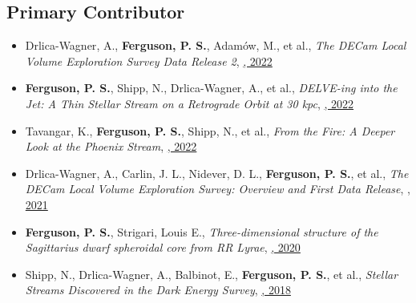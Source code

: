 \renewcommand{\labelitemi}{$$}
\subsection{Primary Contributor}
\begin{itemize}[itemsep=1pt]
    \item {Drlica-Wagner}, A., \textbf{Ferguson, P. S.}, {Adam{\'o}w}, M., et al., \textit{{The DECam Local Volume Exploration Survey Data Release 2}}, \href{https://ui.adsabs.harvard.edu/abs/2022ApJS..261...38D}{\textbf{\apjs}, 2022}
    \item \textbf{Ferguson, P. S.}, {Shipp}, N., {Drlica-Wagner}, A., et al., \textit{{DELVE-ing into the Jet: A Thin Stellar Stream on a Retrograde Orbit at 30 kpc}}, \href{https://ui.adsabs.harvard.edu/abs/2022AJ....163...18F}{\textbf{\aj}, 2022}
    \item {Tavangar}, K., \textbf{Ferguson, P. S.}, {Shipp}, N., et al., \textit{{From the Fire: A Deeper Look at the Phoenix Stream}}, \href{https://ui.adsabs.harvard.edu/abs/2022ApJ...925..118T}{\textbf{\apj}, 2022}
    \item {Drlica-Wagner}, A., {Carlin}, J. L., {Nidever}, D. L., \textbf{Ferguson, P. S.}, et al., \textit{{The DECam Local Volume Exploration Survey: Overview and First Data Release}}, \href{https://ui.adsabs.harvard.edu/abs/2021ApJS..256....2D}{\textbf{\apjs}, 2021}
    \item \textbf{Ferguson, P. S.}, {Strigari}, Louis E., \textit{{Three-dimensional structure of the Sagittarius dwarf spheroidal core from RR Lyrae}}, \href{https://ui.adsabs.harvard.edu/abs/2020MNRAS.495.4124F}{\textbf{\mnras}, 2020}
    \item {Shipp}, N., {Drlica-Wagner}, A., {Balbinot}, E., \textbf{Ferguson, P. S.}, et al., \textit{{Stellar Streams Discovered in the Dark Energy Survey}}, \href{https://ui.adsabs.harvard.edu/abs/2018ApJ...862..114S}{\textbf{\apj}, 2018}
\end{itemize}
